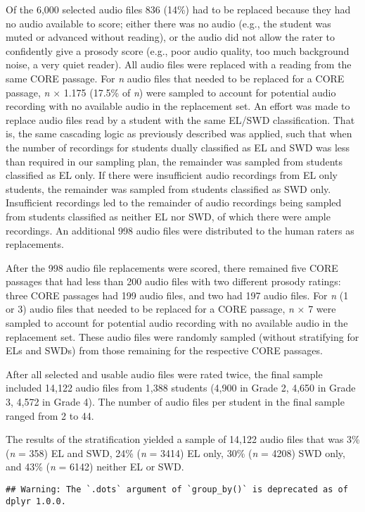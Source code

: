 \documentclass[
]{article}
\begin{document}
Of the 6,000 selected audio files 836 (14\%) had to be replaced because
they had no audio available to score; either there was no audio (e.g.,
the student was muted or advanced without reading), or the audio did not
allow the rater to confidently give a prosody score (e.g., poor audio
quality, too much background noise, a very quiet reader). All audio
files were replaced with a reading from the same CORE passage. For
\emph{n} audio files that needed to be replaced for a CORE passage,
\emph{n} \(\times\) 1.175 (17.5\% of \emph{n}) were sampled to account
for potential audio recording with no available audio in the replacement
set. An effort was made to replace audio files read by a student with
the same EL/SWD classification. That is, the same cascading logic as
previously described was applied, such that when the number of
recordings for students dually classified as EL and SWD was less than
required in our sampling plan, the remainder was sampled from students
classified as EL only. If there were insufficient audio recordings from
EL only students, the remainder was sampled from students classified as
SWD only. Insufficient recordings led to the remainder of audio
recordings being sampled from students classified as neither EL nor SWD,
of which there were ample recordings. An additional 998 audio files were
distributed to the human raters as replacements.

After the 998 audio file replacements were scored, there remained five
CORE passages that had less than 200 audio files with two different
prosody ratings: three CORE passages had 199 audio files, and two had
197 audio files. For \emph{n} (1 or 3) audio files that needed to be
replaced for a CORE passage, \emph{n} \(\times\) 7 were sampled to
account for potential audio recording with no available audio in the
replacement set. These audio files were randomly sampled (without
stratifying for ELs and SWDs) from those remaining for the respective
CORE passages.

After all selected and usable audio files were rated twice, the final
sample included 14,122 audio files from 1,388 students (4,900 in Grade
2, 4,650 in Grade 3, 4,572 in Grade 4). The number of audio files per
student in the final sample ranged from 2 to 44.

The results of the stratification yielded a sample of 14,122 audio files
that was 3\% (\emph{n} = 358) EL and SWD, 24\% (\emph{n} = 3414) EL
only, 30\% (\emph{n} = 4208) SWD only, and 43\% (\emph{n} = 6142)
neither EL or SWD.

\begin{verbatim}
## Warning: The `.dots` argument of `group_by()` is deprecated as of dplyr 1.0.0.
\end{verbatim}
\end{document}
